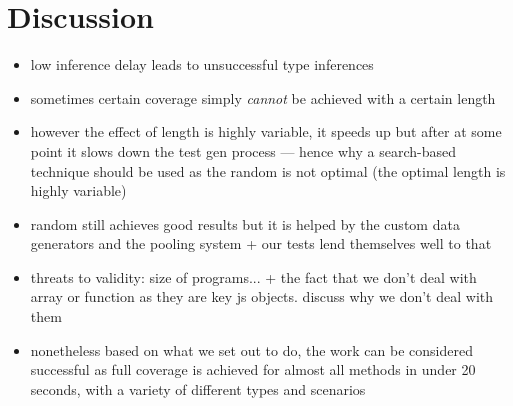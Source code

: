 \section{Discussion}
\begin{itemize}
   \item low inference delay leads to unsuccessful type inferences
   \item sometimes certain coverage simply \emph{cannot} be achieved with a certain length
   \item however the effect of length is highly variable, it speeds up but after at some point it slows down the test gen process --- hence why a search-based technique should be used as the random is not optimal (the optimal length is highly variable)
   \item random still achieves good results but it is helped by the custom data generators and the pooling system + our tests lend themselves well to that
   \item threats to validity: size of programs... + the fact that we don't deal with array or function as they are key js objects. discuss why we don't deal with them
   \item nonetheless based on what we set out to do, the work can be considered successful as full coverage is achieved for almost all methods in under 20 seconds, with a variety of different types and scenarios
\end{itemize}
